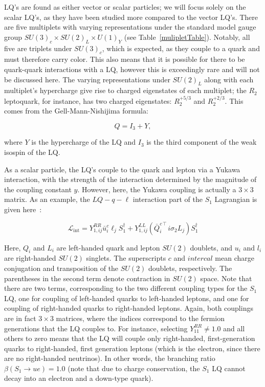     LQ's are found as either vector or scalar particles; we will focus solely on the scalar LQ's, as they have been studied more compared to the vector LQ's. There are five multiplets with varying representations under the standard model gauge group $SU(3)_c \times SU(2)_L \times U(1)_Y$ (see Table~\ref{mulipletTable}). Notably, all five are triplets under $SU(3)_c$, which is expected, as they couple to a quark and must therefore carry color. This also means that it is possible for there to be quark-quark interactions with a LQ, however this is exceedingly rare and will not be discussed here. The varying representations under $SU(2)_L$ along with each multiplet's hypercharge give rise to charged eigenstates of each multiplet; the $R_2$ leptoquark, for instance, has two charged eigenstates: $R_2^{+5/3}$ and $R_2^{+2/3}$. This comes from the Gell-Mann-Nishijima formula:

    \begin{equation}
        Q = I_3 + Y,
    \end{equation}

    where $Y$ is the hypercharge of the LQ and $I_3$ is the third component of the weak isospin of the LQ.

    As a scalar particle, the LQ's couple to the quark and lepton via a Yukawa interaction, with the strength of the interaction determined by the magnitude of the coupling constant $y$. However, here, the Yukawa coupling is actually a $3\times3$ matrix. As an example, the $LQ-q-\ell$ interaction part of the $S_1$ Lagrangian is given here~\cite{Crivellin_2022}:

    \begin{equation}
        \mathcal{L}_{\text{int}} = Y_{1,ij}^{RR} \bar{u}_i^c \ell_j S_1^{\dagger} + Y_{1,ij}^{LL} \left(\bar{Q}_i^{c\intercal} i\sigma_2 L_j \right) S_1^{\dagger}
    \end{equation}

    Here, $Q_i$ and $L_i$ are left-handed quark and lepton $SU(2)$ doublets, and $u_i$ and $l_i$ are right-handed $SU(2)$ singlets. The superscripts $c$ and $intercal$ mean charge conjugation and transposition of the $SU(2)$ doublets, respectively. The parentheses in the second term denote contraction in $SU(2)$ space. Note that there are two terms, corresponding to the two different coupling types for the $S_1$ LQ, one for coupling of left-handed quarks to left-handed leptons, and one for coupling of right-handed quarks to right-handed leptons. Again, both couplings are in fact $3\times3$ matrices, where the indices correspond to the fermion generations that the LQ couples to. For instance, selecting $Y^{RR}_{11} \neq 1.0$ and all others to zero means that the LQ will couple only right-handed, first-generation quarks to right-handed, first generation leptons (which is the electron, since there are no right-handed neutrinos). In other words, the branching ratio $\beta(S_1 \rightarrow ue)=1.0$ (note that due to charge conservation, the $S_1$ LQ cannot decay into an electron and a down-type quark).


